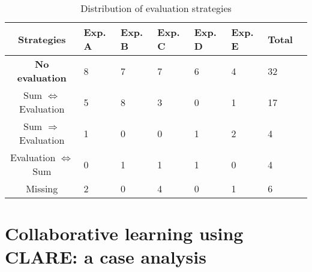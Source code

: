 \small
\begin{table}[hbtp]
    \caption{Distribution of evaluation strategies}
    \begin{center}
    \begin{tabular} {||c|p{0.4in}|p{0.4in}|p{0.4in}|p{0.4in}|p{0.4in}|p{0.4in}|p{0.4in}||} \hline   
      {\bf Strategies} & {\bf Exp. A} & {\bf Exp. B} & {\bf Exp. C} &
      {\bf Exp. D} & {\bf Exp. E} & {\bf Total}\\ \hline \hline
      
      {\bf No evaluation } & 8 & 7 & 7 & 6 &  4 & 32 \\ \hline

      {\sf Sum } \({\Leftrightarrow}\) {\sf Evaluation} &  5 & 8  & 3  & 0  & 1  & 17 \\ \hline

      {\sf Sum } \( \Rightarrow \) {\sf Evaluation\/} & 1 & 0 & 0 & 1 & 2  & 4 \\ \hline
            
      {\sf Evaluation} \({\Leftrightarrow}\) {\sf Sum\/} & 0 & 1 & 1 & 1 & 0& 4\\ \hline

      Missing & 2 & 0 & 4 & 0 & 1  & 6 \\ \hline
    \end{tabular}      
    \end{center}
    \label{tab:evaluation strategies}
\end{table}
\normalsize
{}


\section{Collaborative learning using CLARE: a case analysis}
\label{sec:case}

